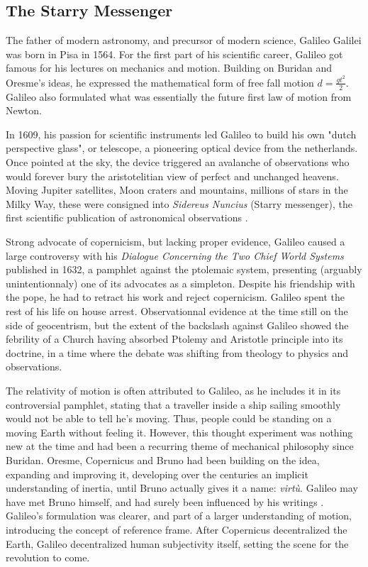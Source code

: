 \subsection{The Starry Messenger}


The father of modern astronomy, and precursor of modern science, Galileo Galilei was born in Pisa in 1564. For the first part of his scientific career, Galileo got famous for his lectures on mechanics and motion. Building on Buridan and Oresme's ideas, he expressed the mathematical form of free fall motion $ d = \frac{gt^2}{2}$. Galileo also formulated what was essentially the future first law of motion from Newton.

In 1609, his passion for scientific instruments led Galileo to build his own "dutch perspective glass", or telescope, a pioneering optical device from the netherlands. Once pointed at the sky, the device triggered an avalanche of observations who would forever bury the aristotelitian view of perfect and unchanged heavens. Moving Jupiter satellites, Moon craters and mountains, millions of stars in the Milky Way, these were consigned into \textit{Sidereus Nuncius} (Starry messenger), the first scientific publication of astronomical observations \citep{galileo1610}.

Strong advocate of copernicism, but lacking proper evidence, Galileo caused a large controversy with his 
\textit{Dialogue Concerning the Two Chief World Systems} published in 1632, a pamphlet against the ptolemaic system, presenting (arguably unintentionnaly) one of its advocates as a simpleton. Despite his friendship with the pope, he had to retract his work and reject copernicism. Galileo spent the rest of his life on house arrest. Observationnal evidence at the time still on the side of geocentrism, but the extent of the backslash against Galileo showed the febrility of a Church having absorbed Ptolemy and Aristotle principle into its doctrine, in a time where the debate was shifting from theology to physics and observations.

The relativity of motion is often attributed to Galileo, as he includes it in its controversial pamphlet, stating that a traveller inside a ship sailing smoothly would not be able to tell he's moving. Thus, people could be standing on a moving Earth without feeling it. However, this thought experiment was nothing new at the time and had been a recurring theme of mechanical philosophy since Buridan. Oresme, Copernicus and Bruno had been building on the idea, expanding and improving it, developing over the centuries an implicit understanding of inertia, until Bruno actually gives it a name: \textit{virt\`u}. Galileo may have met Bruno himself, and had surely been influenced by his writings \citep{DeAngelis2015}. Galileo's formulation was clearer, and part of a larger understanding of motion, introducing the concept of reference frame. After Copernicus decentralized the Earth, Galileo decentralized human subjectivity itself, setting the scene for the revolution to come. 

